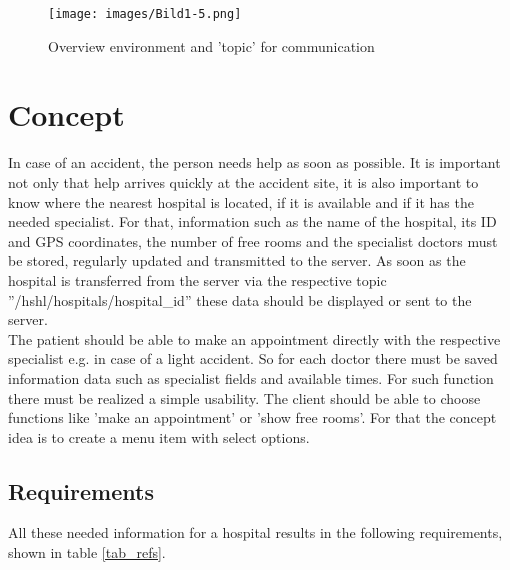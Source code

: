\begin{figure}[H]
\centering
\sidecaption
\texttt{[image: images/Bild1-5.png]}
\caption{Overview environment and 'topic' for communication}
\label{Overview environment}
\end{figure}



\section{Concept}
\label{sec:3}
In case of an accident, the person needs help as soon as possible. 
It is important not only that help arrives quickly at the accident site, 
it is also important to know where the nearest hospital is located, 
if it is available and if it has the needed specialist. For that, information such as the name of the hospital, its ID and  GPS coordinates, the number of free rooms and the specialist doctors must be stored, regularly updated and transmitted to the server.
As soon as the hospital is transferred from the server via the respective topic ''/hshl/hospitals/hospital_id'' 
these data should be displayed or sent to the server. 
\\
The patient should be able to make an appointment directly with the respective specialist e.g. in case of a light accident.
So for each doctor there must be saved information data such as specialist fields and available times.
For such function there must be realized a simple usability. The client should be able to choose functions like 'make an appointment' or 'show free rooms'. For that the concept idea is to create a menu item with select options.


\subsection{Requirements}
All these needed information for a hospital results in the following requirements, shown in table \ref{tab_refs}.


